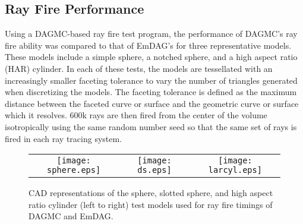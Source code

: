 \subsection{Ray Fire Performance}\label{subsubsec:emdag_rf_performance}

Using a DAGMC-based ray fire test program, the performance of DAGMC's ray fire
ability was compared to that of EmDAG's for three representative models. These
models include a simple sphere, a notched sphere, and a high aspect ratio (HAR)
cylinder. In each of these tests, the models are tessellated with an
increasingly smaller faceting tolerance to vary the number of triangles
generated when discretizing the models. The faceting tolerance is defined as the
maximum distance between the faceted curve or surface and the geometric curve or
surface which it resolves. 600k rays are then fired from the center of the
volume isotropically using the same random number seed so that the same set of
rays is fired in each ray tracing system.

\begin{figure}[H]
  \begin{center}
    \begin{tabular}{ccc}
      \texttt{[image: sphere.eps]} &
      \texttt{[image: ds.eps]} &
      \texttt{[image: larcyl.eps]} \\
    \end{tabular}
    \caption[Ray fire test models.]{CAD representations of the sphere, slotted
      sphere, and high aspect ratio cylinder (left to right) test models used
      for ray fire timings of DAGMC and EmDAG. \label{models}}
  \end{center}
\end{figure} 

